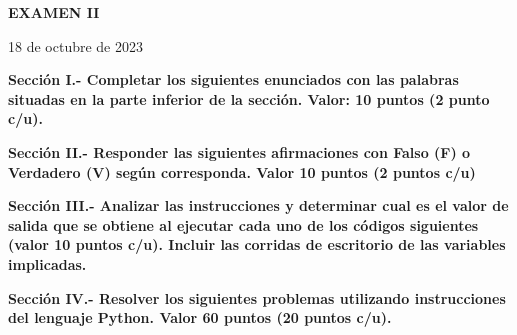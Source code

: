 \documentclass[10pt,addpoints]{exam}
\begin{document}
\begin{center}
  \sffamily\textbf{EXAMEN II}
\end{center}
\begin{flushright}
18 de octubre de 2023
\end{flushright}

\begin{questions}
\begin{EnvFullwidth}
  \sffamily\textbf{Sección I.- Completar los siguientes enunciados con las
  palabras situadas en la parte inferior de la sección. Valor: 10 puntos
  (2 punto c/u).}
\end{EnvFullwidth}








\end{questions}

\begin{questions}
\begin{EnvFullwidth}
  \sffamily\textbf{Sección II.- Responder las siguientes afirmaciones con
  Falso (F) o Verdadero (V) según corres\-ponda. Valor 10 puntos (2 puntos c/u)}
\end{EnvFullwidth}







\end{questions}


\begin{questions}
\begin{EnvFullwidth}
  \sffamily\textbf{Sección III.- Analizar las instrucciones y determinar
  cual es el valor de salida que se obtiene al ejecutar cada uno de los
  códigos siguientes (valor 10 puntos c/u). Incluir las corridas de
  escritorio de las variables implicadas.
  }
\end{EnvFullwidth}



%

\end{questions}

\begin{questions}
\begin{EnvFullwidth}
  \sffamily\textbf{Sección IV.- Resolver los siguientes problemas utilizando
  instrucciones del lenguaje Python. Valor 60 puntos (20 puntos c/u).}
\end{EnvFullwidth}





\end{questions}
\end{document}

